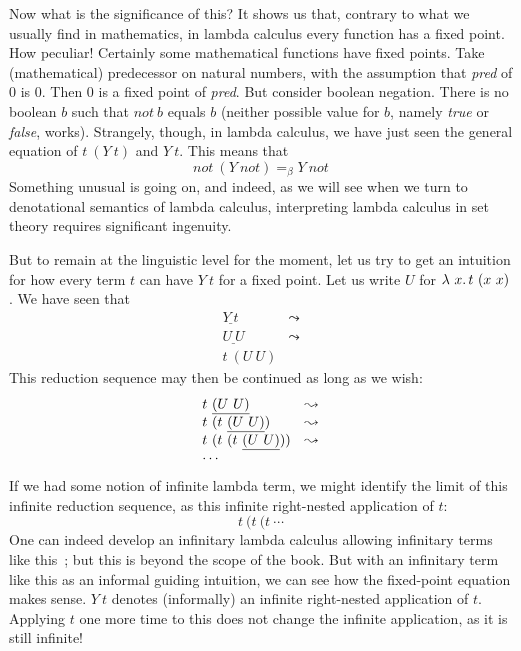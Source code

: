 Now what is the significance of this?  It shows us that, contrary to
what we usually find in mathematics, in lambda calculus every function
has a fixed point.  How peculiar!  Certainly some mathematical
functions have fixed points.  Take (mathematical) predecessor on
natural numbers, with the assumption that \textit{pred} of $0$ is $0$.
Then $0$ is a fixed point of \textit{pred}.  But consider boolean negation.
There is no boolean $b$ such that $\textit{not}\ b$ equals $b$ (neither possible
value for $b$, namely \textit{true} or \textit{false}, works).  Strangely, though,
in lambda calculus, we have just seen the general equation of $t\ (Y\ t)$ and $Y\ t$.
This means that
\[
\textit{not}\ (Y\ \textit{not}) =_\beta Y\ \textit{not}
\]
\noindent Something unusual is going on, and indeed, as we will see when we
turn to denotational semantics of lambda calculus, interpreting lambda calculus
in set theory requires significant ingenuity.

But to remain at the linguistic level for the moment, let us try to get an intuition
for how every term $t$ can have $Y\ t$ for a fixed point.  Let us write $U$ for $\lambda\ x.\, t\ (x\ x)$.  We have seen that
\[
\begin{array}{ll}
  \underline{Y\ t} & \leadsto \\
  \underline{U\ U} & \leadsto \\
  t\ (U\ U)&\ 
\end{array}
  \]
\noindent  This reduction sequence may then be continued as long as we wish:
\[
\begin{array}{ll}
  t\ \underline{(U\ U)}&\leadsto \\
  t\ (t\ \underline{(U\ U)})&\leadsto \\  
  t\ (t\ (t\ \underline{(U\ U)}))&\leadsto \\
  \multicolumn{2}{l}{\cdots}
\end{array}
\]
\noindent If we had some notion of infinite lambda term, we might identify the limit of this infinite reduction sequence,
as this infinite right-nested application of $t$:
\[
t\ (t\ (t\ \cdots
\]
\noindent One can indeed develop an infinitary lambda calculus
allowing infinitary terms like this~\cite{kennaway1997}; but this is
beyond the scope of the book.  But with an infinitary term like
this as an informal guiding intuition, we can see how the fixed-point equation
makes sense.  $Y\ t$ denotes (informally) an infinite
right-nested application of $t$.  Applying $t$ one more time to this
does not change the infinite application, as it is still infinite!

